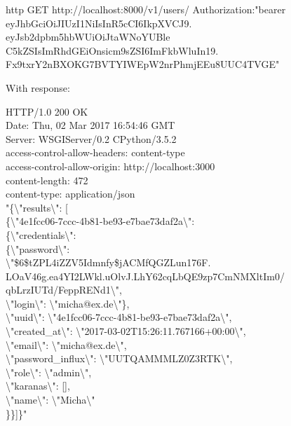\begin{tcolorbox}
http GET http://localhost:8000/v1/users/ Authorization:"bearer\\ eyJhbGciOiJIUzI1NiIsInR5cCI6IkpXVCJ9.\\
eyJsb2dpbm5hbWUiOiJtaWNoYUBle\\
C5kZSIsImRhdGEiOnsicm9sZSI6ImFkbWluIn19.\\
Fx9txrY2nBXOKG7BVTYIWEpW2nrPhmjEEu8UUC4TVGE"
\end{tcolorbox}
With response:
\begin{tcolorbox}
HTTP/1.0 200 OK\\
Date: Thu, 02 Mar 2017 16:54:46 GMT\\
Server: WSGIServer/0.2 CPython/3.5.2\\
access-control-allow-headers: content-type\\
access-control-allow-origin: http://localhost:3000\\
content-length: 472\\
content-type: application/json\\

"\{\textbackslash"results\textbackslash": [\\
\{\textbackslash"4e1fcc06-7ccc-4b81-be93-e7bae73daf2a\textbackslash": \\
\{\textbackslash"credentials\textbackslash":\\ 
\{\textbackslash"password\textbackslash":\\ \textbackslash"\$6\$tZPL4iZZV5Idmnfy\$jACMfQGZLun176F.\\
LOaV46g.ea4YI2LWkl.uOlvJ.LhY62cqLbQE9zp7CmNMXltIm0/\\qbLrzIUTd/FeppRENd1\textbackslash",\\
\textbackslash"login\textbackslash": \textbackslash"micha@ex.de\textbackslash"\},\\ 
\textbackslash"uuid\textbackslash": \textbackslash"4e1fcc06-7ccc-4b81-be93-e7bae73daf2a\textbackslash",\\
\textbackslash"created\_at\textbackslash": \textbackslash"2017-03-02T15:26:11.767166+00:00\textbackslash",\\
\textbackslash"email\textbackslash": \textbackslash"micha@ex.de\textbackslash",\\
\textbackslash"password\_influx\textbackslash": \textbackslash"UUTQAMMMLZ0Z3RTK\textbackslash",\\
\textbackslash"role\textbackslash": \textbackslash"admin\textbackslash",\\
\textbackslash"karanas\textbackslash": [],\\
\textbackslash"name\textbackslash": \textbackslash"Micha\textbackslash"\\
\}\}]\}"
\end{tcolorbox}
